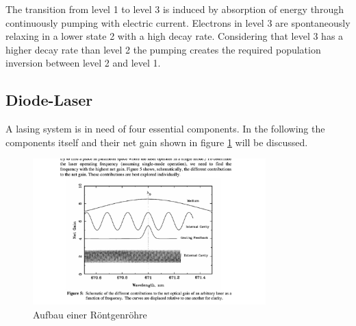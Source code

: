 \noindent
The transition from level 1 to level 3 is induced by absorption of energy through continuously pumping with electric current.
Electrons in level 3 are spontaneously relaxing in a lower state 2 with a high decay rate.
Considering that level 3 has a higher decay rate than level 2 the pumping creates the required population inversion between level 2 and level 1.


\subsection{Diode-Laser}
\noindent
A lasing system is in need of four essential components.
In the following the components itself and their net gain shown in figure \ref{fig:netgain} will be discussed.

\begin{figure}
  \centering
  \includegraphics[width=9cm]{net_gain.pdf}
  \caption{Aufbau einer Röntgenröhre} %
  \label{fig:netgain}
\end{figure}

